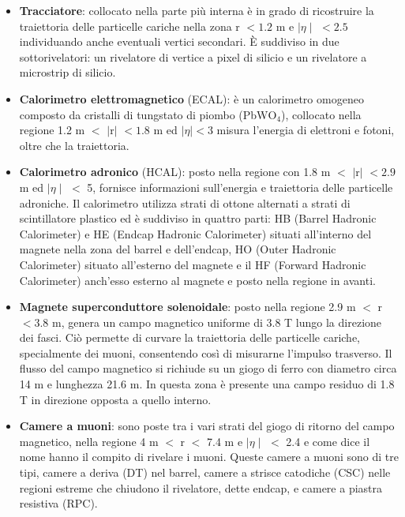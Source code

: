 \begin{itemize}
\item \textbf{Tracciatore}: collocato nella parte più interna è in grado di ricostruire la traiettoria delle particelle cariche  nella zona r $< 1.2$ m e $\mid\eta\mid$ $< 2.5$ individuando anche
eventuali vertici secondari. È suddiviso in due sottorivelatori: un rivelatore di vertice a pixel di silicio e un rivelatore a microstrip di silicio.

\item \textbf{Calorimetro elettromagnetico} (ECAL): è un calorimetro omogeneo composto da cristalli di tungstato di piombo (PbW$\mathrm{O_4}$), collocato nella regione 1.2 m $<$ $\mid$r$\mid$ $< 1.8$ m ed $\mid\eta\mid < 3$ misura l'energia di elettroni e fotoni, oltre che la traiettoria.

\item \textbf{Calorimetro adronico} (HCAL): posto nella regione con 1.8 m $<$ $\mid$r$\mid$ $< 2.9$ m ed $\mid\eta\mid$ $<$ 5, fornisce informazioni sull’energia e traiettoria delle particelle
adroniche. Il calorimetro utilizza strati di ottone alternati a strati di scintillatore plastico ed è suddiviso in quattro parti: HB (Barrel Hadronic Calorimeter) e HE (Endcap Hadronic Calorimeter) situati all’interno del magnete nella zona del barrel e dell’endcap, HO (Outer Hadronic Calorimeter) situato all'esterno del magnete e il HF (Forward Hadronic Calorimeter) anch'esso esterno al magnete e posto nella regione in avanti.

\item \textbf{Magnete superconduttore solenoidale}: posto nella regione 2.9 m $<$ r $< 3.8$ m, genera un campo magnetico uniforme di 3.8 T lungo la direzione dei fasci. Ciò permette di curvare la traiettoria delle particelle cariche, specialmente dei muoni, consentendo così di misurarne l'impulso trasverso. Il flusso del campo magnetico si richiude su un giogo di
ferro con diametro circa 14 m e lunghezza 21.6 m. In questa zona è presente una campo residuo di 1.8 T in direzione opposta a quello interno.

\item \textbf{Camere a muoni}: sono poste tra i vari strati del giogo di ritorno del campo magnetico, nella regione 4 m $<$ r $<$ 7.4 m e $\mid\eta\mid$ $<$ 2.4 e come dice il nome hanno il compito di rivelare i muoni. Queste camere a muoni sono di tre tipi, camere a deriva (DT) nel barrel, camere a strisce catodiche (CSC) nelle regioni estreme che chiudono il rivelatore, dette endcap, e camere a piastra resistiva (RPC).

\end{itemize}
